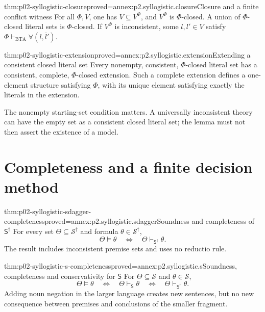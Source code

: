 \begin{hblemma}{thm:p02-syllogistic-closure}{proved=annex:p2.syllogistic.closure}{Closure and a finite conflict witness}
For all \(\Phi,V\), one has \(V\subseteq V^\Phi\), and \(V^\Phi\) is
\(\Phi\)-closed. A union of \(\Phi\)-closed literal sets is
\(\Phi\)-closed. If \(V^\Phi\) is inconsistent, some \(l,l'\in V\) satisfy
\(\Phi\vdash_{\mathrm{BTA}}\forall(l,\bar l')\).
\end{hblemma}

\begin{hblemma}{thm:p02-syllogistic-extension}{proved=annex:p2.syllogistic.extension}{Extending a consistent closed literal set}
Every nonempty, consistent, \(\Phi\)-closed literal set has a consistent,
complete, \(\Phi\)-closed extension. Such a complete extension defines a
one-element structure satisfying \(\Phi\), with its unique element satisfying
exactly the literals in the extension.
\end{hblemma}

The nonempty starting-set condition matters. A universally inconsistent
theory can have the empty set as a consistent closed literal set; the lemma
must not then assert the existence of a model.

\section{Completeness and a finite decision method}

\begin{hbtheorem}{thm:p02-syllogistic-sdagger-completeness}{proved=annex:p2.syllogistic.sdagger}{Soundness and completeness of \(\mathsf S^\dagger\)}
For every set \(\Theta\subseteq\mathcal S^\dagger\) and formula
\(\theta\in\mathcal S^\dagger\),
\[
 \Theta\models\theta
 \quad\Longleftrightarrow\quad
 \Theta\vdash_{\mathsf S^\dagger}\theta.
\]
The result includes inconsistent premise sets and uses no reductio rule.
\end{hbtheorem}

\begin{hbtheorem}{thm:p02-syllogistic-s-completeness}{proved=annex:p2.syllogistic.s}{Soundness, completeness and conservativity for \(\mathsf S\)}
For \(\Theta\subseteq\mathcal S\) and \(\theta\in\mathcal S\),
\[
 \Theta\models\theta
 \quad\Longleftrightarrow\quad
 \Theta\vdash_{\mathsf S}\theta
 \quad\Longleftrightarrow\quad
 \Theta\vdash_{\mathsf S^\dagger}\theta.
\]
Adding noun negation in the larger language creates new sentences, but no new
consequence between premises and conclusions of the smaller fragment.
\end{hbtheorem}

